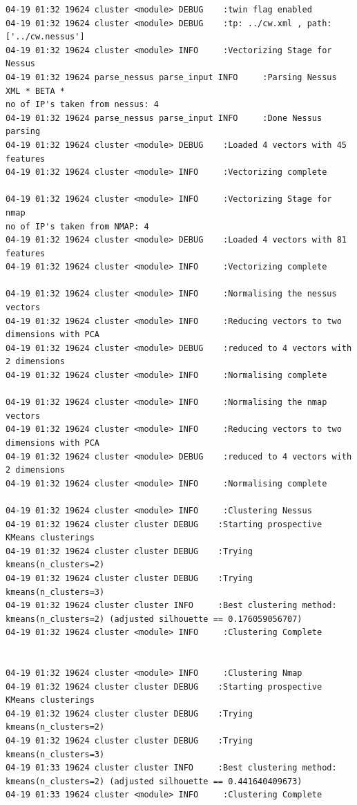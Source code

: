 \begin{lstlisting}[style=lineoutput]
04-19 01:32 19624 cluster <module> DEBUG    :twin flag enabled
04-19 01:32 19624 cluster <module> DEBUG    :tp: ../cw.xml , path: ['../cw.nessus']
04-19 01:32 19624 cluster <module> INFO     :Vectorizing Stage for Nessus
04-19 01:32 19624 parse_nessus parse_input INFO     :Parsing Nessus XML * BETA *
no of IP's taken from nessus: 4
04-19 01:32 19624 parse_nessus parse_input INFO     :Done Nessus parsing
04-19 01:32 19624 cluster <module> DEBUG    :Loaded 4 vectors with 45 features
04-19 01:32 19624 cluster <module> INFO     :Vectorizing complete

04-19 01:32 19624 cluster <module> INFO     :Vectorizing Stage for nmap
no of IP's taken from NMAP: 4
04-19 01:32 19624 cluster <module> DEBUG    :Loaded 4 vectors with 81 features
04-19 01:32 19624 cluster <module> INFO     :Vectorizing complete

04-19 01:32 19624 cluster <module> INFO     :Normalising the nessus vectors
04-19 01:32 19624 cluster <module> INFO     :Reducing vectors to two dimensions with PCA
04-19 01:32 19624 cluster <module> DEBUG    :reduced to 4 vectors with 2 dimensions
04-19 01:32 19624 cluster <module> INFO     :Normalising complete

04-19 01:32 19624 cluster <module> INFO     :Normalising the nmap vectors
04-19 01:32 19624 cluster <module> INFO     :Reducing vectors to two dimensions with PCA
04-19 01:32 19624 cluster <module> DEBUG    :reduced to 4 vectors with 2 dimensions
04-19 01:32 19624 cluster <module> INFO     :Normalising complete

04-19 01:32 19624 cluster <module> INFO     :Clustering Nessus
04-19 01:32 19624 cluster cluster DEBUG    :Starting prospective KMeans clusterings
04-19 01:32 19624 cluster cluster DEBUG    :Trying kmeans(n_clusters=2)
04-19 01:32 19624 cluster cluster DEBUG    :Trying kmeans(n_clusters=3)
04-19 01:32 19624 cluster cluster INFO     :Best clustering method: kmeans(n_clusters=2) (adjusted silhouette == 0.176059056707)
04-19 01:32 19624 cluster <module> INFO     :Clustering Complete


04-19 01:32 19624 cluster <module> INFO     :Clustering Nmap
04-19 01:32 19624 cluster cluster DEBUG    :Starting prospective KMeans clusterings
04-19 01:32 19624 cluster cluster DEBUG    :Trying kmeans(n_clusters=2)
04-19 01:32 19624 cluster cluster DEBUG    :Trying kmeans(n_clusters=3)
04-19 01:33 19624 cluster cluster INFO     :Best clustering method: kmeans(n_clusters=2) (adjusted silhouette == 0.441640409673)
04-19 01:33 19624 cluster <module> INFO     :Clustering Complete



\end{lstlisting}
